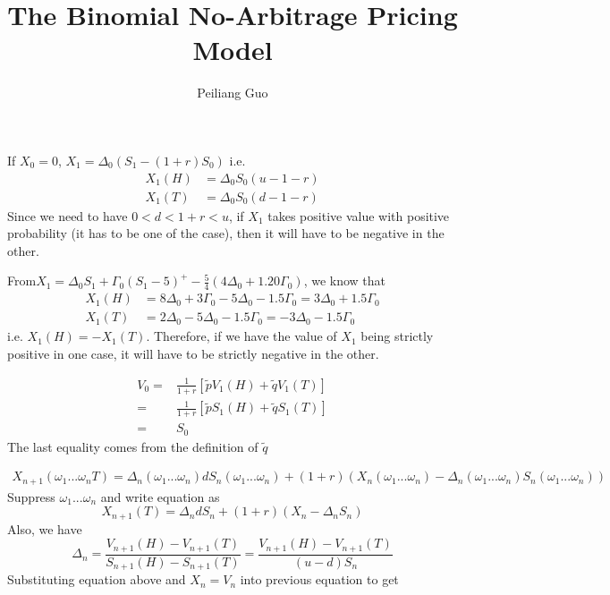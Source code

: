 \documentclass[12pt]{article}
\newenvironment{problem}[2][Problem]{\begin{trivlist}
		\item[\hskip \labelsep {\bfseries #1}\hskip \labelsep {\bfseries #2.}]}{\end{trivlist}}
\begin{document}
	
	\title{The Binomial No-Arbitrage Pricing Model}
	\author{Peiliang Guo}
	\maketitle
	\begin{problem}{1}
	\end{problem}
	If $X_0=0$, 
	$X_1=\Delta_0(S_1-(1+r)S_0)$
	i.e.\begin{align*}
	X_1(H) &= \Delta_0S_0(u-1-r)\\
	X_1(T) &= \Delta_0S_0(d-1-r)
	\end{align*}
	Since we need to have $0<d<1+r<u$, if $X_1$ takes positive value with positive probability (it has to be one of the case), then it will have to be negative in the other.
	\begin{problem}{2}\end{problem}
	From$X_1 = \Delta_0S_1+\Gamma_0(S_1-5)^+-\frac{5}{4}(4\Delta_0+1.20\Gamma_0)$, we know that
	\begin{align*}X_1(H) &= 8\Delta_0+3\Gamma_0-5\Delta_0-1.5\Gamma_0=3\Delta_0+1.5\Gamma_0\\
	X_1(T) &= 2\Delta_0-5\Delta_0-1.5\Gamma_0=-3\Delta_0-1.5\Gamma_0
	\end{align*}
	i.e. $X_1(H)=-X_1(T)$. Therefore, if we have the value of $X_1$ being strictly positive in one case, it will have to be strictly negative in the other.
	\begin{problem}{3}\end{problem}
	\begin{align*}V_0 =& \frac{1}{1+r}[\tilde{p}V_1(H)+\tilde{q}V_1(T)]\\
				=&\frac{1}{1+r}[\tilde{p}S_1(H)+\tilde{q}S_1(T)]\\
				=&S_0\end{align*}
	The last equality comes from the definition of $\tilde{q}$
	\begin{problem}{4}\end{problem}
	\begin{align*}
	X_{n+1}(\omega_1...\omega_nT)=\Delta_n(\omega_1...\omega_n)dS_n(\omega_1...\omega_n)+(1+r)\left(X_n(\omega_1...\omega_n)-\Delta_n(\omega_1...\omega_n)S_n(\omega_1...\omega_n)\right)
	\end{align*}
	Suppress $\omega_1...\omega_n$ and write equation as 
	$$X_{n+1}(T) = \Delta_ndS_n+(1+r)(X_n-\Delta_nS_n)$$
	Also, we have $$\Delta_n=\frac{V_{n+1}(H)-V_{n+1}(T)}{S_{n+1}(H)-S_{n+1}(T)}=\frac{V_{n+1}(H)-V_{n+1}(T)}{(u-d)S_n}$$
	Substituting equation above and $X_n=V_n$ into previous equation to get 
\end{document}
